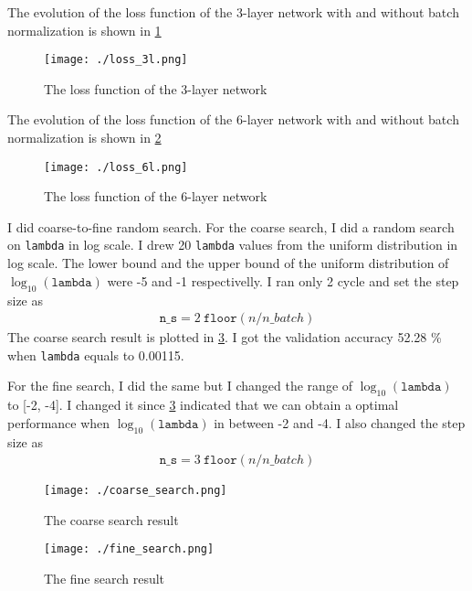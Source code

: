 \documentclass[12pt]{article}
\newenvironment{question}[2][Question]{\begin{trivlist}
\kern10pt
\item[\hskip \labelsep {\bfseries #1}\hskip \labelsep {\bfseries #2.}]}{\end{trivlist}}
\begin{document}
\begin{question}{ii}
    The evolution of the loss function of the 3-layer network with and without
    batch normalization is shown in \cref{plt:loss_3l}
    \begin{figure}[h]
        \centering
        \texttt{[image: ./loss\_3l.png]}
        \caption{The loss function of the 3-layer network}
        \label{plt:loss_3l}
    \end{figure}
\end{question}

\begin{question}{iii}
    The evolution of the loss function of the 6-layer network with and without
    batch normalization is shown in \cref{plt:loss_6l}
    \begin{figure}[h]
        \centering
        \texttt{[image: ./loss\_6l.png]}
        \caption{The loss function of the 6-layer network}
        \label{plt:loss_6l}
    \end{figure}
\end{question}
\begin{question}{iv}
    I did coarse-to-fine random search.
    For the coarse search, I did a random search on \texttt{lambda} in log scale.
    I drew 20 \texttt{lambda} values from the uniform distribution in log scale.
    The lower bound and the upper bound of the uniform distribution of $\log_{10}(\texttt{lambda})$
    were -5 and -1 respectivelly. I ran only 2 cycle and set the step size as
    \begin{align*}
        \texttt{n\_s} = 2 ~ \texttt{floor}(n / n\_batch)
    \end{align*}
    The coarse search result is plotted in \cref{plt:coarse_search}.
    I got the validation accuracy 52.28 \% when \texttt{lambda} equals to 0.00115.

    For the fine search, I did the same but I changed the range of
    $\log_{10}(\texttt{lambda})$ to [-2, -4]. I changed it since
    \cref{plt:coarse_search} indicated that we can obtain a optimal performance
    when $\log_{10}(\texttt{lambda})$ in between -2 and -4.
    I also changed the step size as
    \begin{align*}
        \texttt{n\_s} = 3 ~ \texttt{floor}(n / n\_batch)
    \end{align*}

    \begin{figure}[h]
        \centering
        \texttt{[image: ./coarse\_search.png]}
        \caption{The coarse search result}
        \label{plt:coarse_search}
    \end{figure}

    \begin{figure}[h]
        \centering
        \texttt{[image: ./fine\_search.png]}
        \caption{The fine search result}
        \label{plt:fine_search}
    \end{figure}
\end{question}
\end{document}
